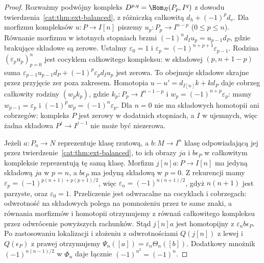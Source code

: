 \begin{proof}
Rozważmy podwójny kompleks $D^{p,q}=\Hom_R(P_p,I^q)$ z dowodu twierdzenia~\ref{cat:thm:ext-balanced}, z różniczką całkowitą $d_h+(-1)^p d_v$. Dla morfizmu kompleksów $u:P\to I[n]$ piszemy $u_p:P_p\to I^{n-p}$ ($0\le p\le n$). Równanie morfizmu w istotnych stopniach brzmi $(-1)^n d_Iu_p=u_{p-1}d_P$, gdzie brakujące składowe są zerowe. Ustalmy $\varepsilon_0=1$ i $\varepsilon_p=(-1)^{n+p+1}\varepsilon_{p-1}$. Rodzina $(\varepsilon_p u_p)_{p=0}^n$ jest cocyklem całkowitego kompleksu: w składowej $(p,n+1-p)$ suma $\varepsilon_{p-1}u_{p-1}d_P+(-1)^p\varepsilon_p d_Iu_p$ jest zerowa. To obejmuje składowe skrajne przez przyjęcie zer poza zakresem. Homotopia $u-u'=d_{I[n]}k+kd_P$ daje cobrzeg całkowity rodziny $(w_p k_p)$, gdzie $k_p:P_p\to I^{n-1-p}$ i $w_p=(-1)^{n+p}\varepsilon_p$: mamy $w_{p-1}=\varepsilon_p$ i $(-1)^p w_p=(-1)^n\varepsilon_p$. Dla $n=0$ nie ma składowych homotopii ani cobrzegów: kompleks $P$ jest zerowy w dodatnich stopniach, a $I$ w ujemnych, więc żadna składowa $P^j\to I^{j-1}$ nie może być niezerowa.

Jeżeli $a:P_n\to N$ reprezentuje klasę rzutową, a $b:M\to I^n$ klasę odpowiadającą jej przez twierdzenie~\ref{cat:thm:ext-balanced}, to ich obrazy $j a$ i $b\epsilon_P$ w całkowitym kompleksie reprezentują tę samą klasę. Morfizm $j[n]a:P\to I[n]$ ma jedyną składową $ja$ w $p=n$, a $b\epsilon_P$ ma jedyną składową w $p=0$. Z rekurencji mamy $\varepsilon_p=(-1)^{p(n+1)+p(p+1)/2}$, więc $\varepsilon_n=(-1)^{n(n+1)/2}$, gdyż $n(n+1)$ jest parzyste, oraz $\varepsilon_0=1$. Przeliczenie jest odwracalne na cocyklach i cobrzegach: odwrotność na składowych polega na pomnożeniu przez te same znaki, a równania morfizmów i homotopii otrzymujemy z równań całkowitego kompleksu przez odwrócenie powyższych rachunków. Stąd $j[n]a$ jest homotopijny z $\varepsilon_n b\epsilon_P$. Po zastosowaniu lokalizacji i złożeniu z odwrotnościami $Q(j[n])$ z lewej i $Q(\epsilon_P)$ z prawej otrzymujemy $\Psi_n([a])=\varepsilon_n\Theta_n([b])$. Dodatkowy mnożnik $(-1)^{n(n-1)/2}$ w $\Phi_n$ daje łącznie $(-1)^{n^2}=(-1)^n$.
\end{proof}

